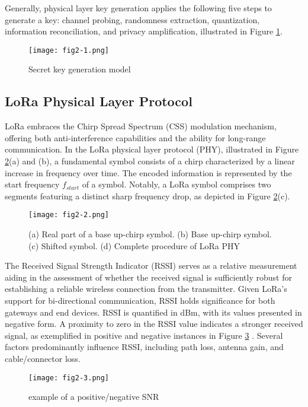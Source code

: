 Generally, physical layer key generation applies the following five steps to generate a key: channel probing, randomness extraction, quantization, information reconciliation, and privacy amplification, illustrated in Figure \ref{fig:2-1}.
\begin{figure}
  \centering
  \texttt{[image: fig2-1.png]}
  \caption{Secret key generation model\cite{7120014}}
  \label{fig:2-1}
\end{figure}

\subsection{LoRa Physical Layer Protocol}
LoRa embraces the Chirp Spread Spectrum (CSS) modulation mechanism, offering both anti-interference capabilities and the ability for long-range communication. In the LoRa physical layer protocol (PHY), illustrated in Figure \ref{fig:2-2}(a) and (b), a fundamental symbol consists of a chirp characterized by a linear increase in frequency over time. The encoded information is represented by the start frequency \(f_{start}\) of a symbol. Notably, a LoRa symbol comprises two segments featuring a distinct sharp frequency drop, as depicted in Figure \ref{fig:2-2}(c).
\begin{figure}
  \centering
  \texttt{[image: fig2-2.png]}
  \caption{(a) Real part of a base up-chirp symbol. (b) Base up-chirp symbol. (c) Shifted symbol. (d) Complete procedure of LoRa PHY\cite{10.1145/3546869}}
  \label{fig:2-2}
\end{figure}

The Received Signal Strength Indicator (RSSI) serves as a relative measurement aiding in the assessment of whether the received signal is sufficiently robust for establishing a reliable wireless connection from the transmitter. Given LoRa's support for bi-directional communication, RSSI holds significance for both gateways and end devices. RSSI is quantified in dBm, with its values presented in negative form. A proximity to zero in the RSSI value indicates a stronger received signal, as exemplified in positive and negative instances in Figure \ref{fig:2-3} \cite{rssiandsnrfigure}. Several factors predominantly influence RSSI, including path loss, antenna gain, and cable/connector loss.
\begin{figure}
  \centering
  \texttt{[image: fig2-3.png]}
  \caption{example of a positive/negative SNR}
  \label{fig:2-3}
\end{figure}

